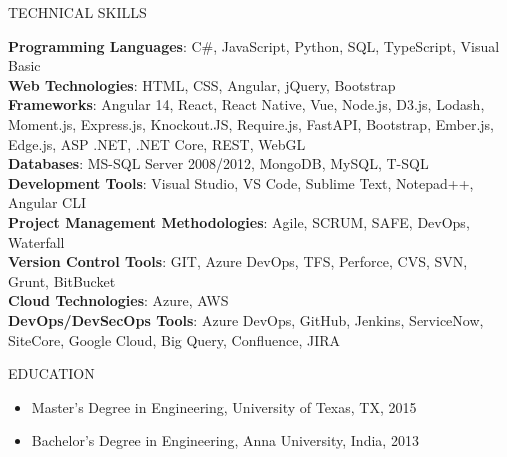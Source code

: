 \documentclass{resume} %
\begin{document}
\begin{rSection}{TECHNICAL SKILLS}
    \begin{flushleft}
                    \textbf{Programming Languages}: C\#, JavaScript, Python, SQL, TypeScript, Visual Basic \\
                    \textbf{Web Technologies}: HTML, CSS, Angular, jQuery, Bootstrap \\
                    \textbf{Frameworks}: Angular 14, React, React Native, Vue, Node.js, D3.js, Lodash, Moment.js, Express.js, Knockout.JS, Require.js, FastAPI, Bootstrap, Ember.js, Edge.js, ASP .NET, .NET Core, REST, WebGL \\
                    \textbf{Databases}: MS{-}SQL Server 2008/2012, MongoDB, MySQL, T{-}SQL \\
                    \textbf{Development Tools}: Visual Studio, VS Code, Sublime Text, Notepad++, Angular CLI \\
                    \textbf{Project Management Methodologies}: Agile, SCRUM, SAFE, DevOps, Waterfall \\
                    \textbf{Version Control Tools}: GIT, Azure DevOps, TFS, Perforce, CVS, SVN, Grunt, BitBucket \\
                    \textbf{Cloud Technologies}: Azure, AWS \\
                    \textbf{DevOps/DevSecOps Tools}: Azure DevOps, GitHub, Jenkins, ServiceNow, SiteCore, Google Cloud, Big Query, Confluence, JIRA \\
            \end{flushleft}
\end{rSection}

\begin{rSection}{EDUCATION}
    \begin{flushleft}
    \begin{itemize}
                    \item Master's Degree in Engineering, University of Texas, TX, 2015 \\
                    \item Bachelor's Degree in Engineering, Anna University, India, 2013 \\
            \end{itemize}
    \end{flushleft}
\end{rSection}
\end{document}
